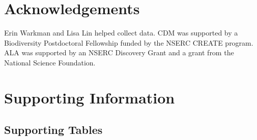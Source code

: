 \documentclass[11pt, oneside]{article}
\begin{document}

\section*{Acknowledgements}
Erin Warkman and Lisa Lin helped collect data. CDM was supported by a Biodiversity Postdoctoral Fellowship funded by the NSERC CREATE program. ALA was supported by an NSERC Discovery Grant and a grant from the National Science Foundation.


\setlength{\bibsep}{6pt}
\bigskip




\clearpage


\section*{Supporting Information}

\renewcommand\thefigure{S\arabic{figure}}    
\renewcommand\thetable{S\arabic{table}}    
\renewcommand\theequation{S\arabic{equation}}    
\setcounter{table}{0}    
\setcounter{equation}{0}
\setcounter{figure}{0}


\subsection*{Supporting Tables}
\end{document}
